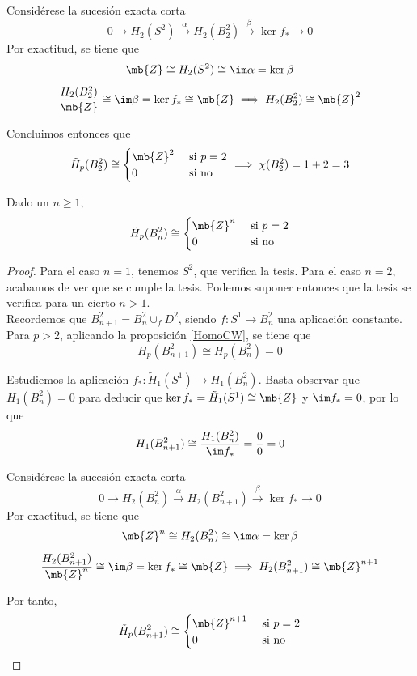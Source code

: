 Considérese la sucesión exacta corta \[0 \longrightarrow H_2(S^2) \xrightarrow{\alpha} H_2(B^2_2) \xrightarrow{\beta} \ker f_* \longrightarrow 0\] Por exactitud, se tiene que \[\mb{Z} \cong H_2(S^2)\cong \im \alpha=\ker \beta \] \[\frac{H_2(B^2_2)}{\mb{Z}}\cong \im\beta=\ker f_*\cong \mb{Z} \implies H_2(B^2_2) \cong \mb{Z}^2\]

Concluimos entonces que \[\tilde{H}_p(B^2_2)\cong \begin{cases}\mb{Z}^2 & \mbox{ si }p=2 \\ 0 & \mbox{ si no}\end{cases} \implies \chi(B^2_2)=1+2=3\]

\begin{teo} Dado un $n \geq 1$,
\[\tilde{H}_p(B^2_n)\cong \begin{cases}\mb{Z}^n & \mbox{ si }p=2 \\ 0 & \mbox{ si no}\end{cases}\]
\end{teo}

\begin{proof}
Para el caso $n=1$, tenemos $S^2$, que verifica la tesis. Para el caso $n=2$, acabamos de ver que se cumple la tesis. Podemos suponer entonces que la tesis se verifica para un cierto $n > 1$.
\\

Recordemos que $B^2_{n+1}=B^2_n \cup_f D^2$, siendo $f: S^1 \longrightarrow B^2_n$ una aplicación constante. Para $p > 2$, aplicando la proposición \ref{HomoCW}, se tiene que \[H_p(B^2_{n+1})\cong H_p(B^2_n)=0\]

Estudiemos la aplicación $f_*: \tilde{H}_1(S^1) \longrightarrow H_1(B^2_n)$. Basta observar que $H_1(B^2_n)=0$ para deducir que $\ker f_*=\tilde{H}_1(S^1) \cong \mb{Z}$ y $\im f_*=0$, por lo que \[H_1(B^2_{n+1})\cong \frac{H_1(B^2_n)}{\im f_*}=\frac{0}{0}=0\]

Considérese la sucesión exacta corta \[0 \longrightarrow H_2(B^2_n) \xrightarrow{\alpha} H_2(B^2_{n+1}) \xrightarrow{\beta} \ker f_* \longrightarrow 0\] Por exactitud, se tiene que \[\mb{Z}^n \cong H_2(B^2_n)\cong \im \alpha=\ker \beta \] \[\frac{H_2(B^2_{n+1})}{\mb{Z}^n}\cong \im\beta=\ker f_*\cong \mb{Z} \implies H_2(B^2_{n+1}) \cong \mb{Z}^{n+1}\]

Por tanto,
\[\tilde{H}_p(B^2_{n+1})\cong \begin{cases}\mb{Z}^{n+1} & \mbox{ si }p=2 \\ 0 & \mbox{ si no}\end{cases}\]
\end{proof}

